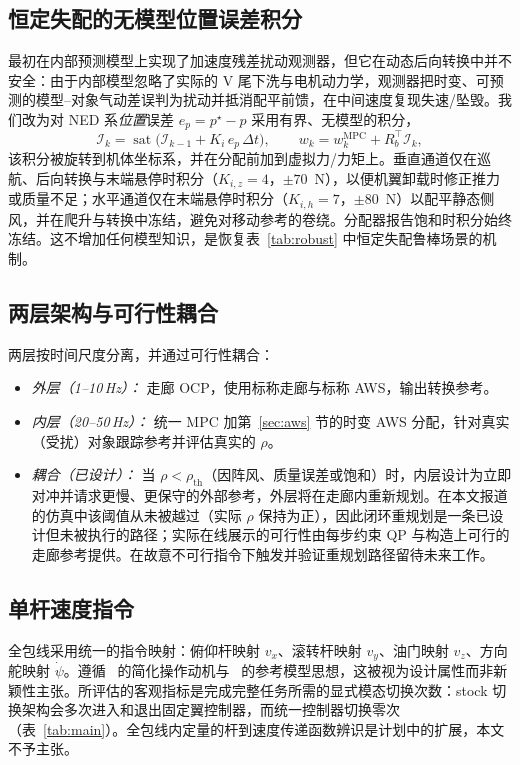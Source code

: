 \documentclass[UTF8,a4paper,11pt]{ctexart}
\begin{document}
\subsection{恒定失配的无模型位置误差积分}\label{sec:integral}
最初在内部预测模型上实现了加速度残差扰动观测器，但它在动态后向转换中并不安全：由于内部模型忽略了实际的 V 尾下洗与电机动力学，观测器把时变、可预测的模型--对象气动差误判为扰动并抵消配平前馈，在中间速度复现失速/坠毁。我们改为对 NED 系\emph{位置}误差 $e_p=p^\star-p$ 采用有界、无模型的积分，
\begin{equation}
\mathcal I_k = \operatorname{sat}\!\bigl(\mathcal I_{k-1}+K_i\,e_p\,\Delta t\bigr),
\qquad
w_k = w_k^{\mathrm{MPC}}+R_b^\top\mathcal I_k ,
\label{eq:integral}
\end{equation}
该积分被旋转到机体坐标系，并在分配前加到虚拟力/力矩上。垂直通道仅在巡航、后向转换与末端悬停时积分（$K_{i,z}=4$，$\pm70$~N），以便机翼卸载时修正推力或质量不足；水平通道仅在末端悬停时积分（$K_{i,h}=7$，$\pm80$~N）以配平静态侧风，并在爬升与转换中冻结，避免对移动参考的卷绕。分配器报告饱和时积分始终冻结。这不增加任何模型知识，是恢复表~\ref{tab:robust} 中恒定失配鲁棒场景的机制。

\subsection{两层架构与可行性耦合}\label{sec:twolayer}
两层按时间尺度分离，并通过可行性耦合：
\begin{itemize}[leftmargin=1.6em,itemsep=2pt]
  \item \emph{外层（1--10\,Hz）：} 走廊 OCP，使用标称走廊与标称 AWS，输出转换参考。
  \item \emph{内层（20--50\,Hz）：} 统一 MPC 加第~\ref{sec:aws} 节的时变 AWS 分配，针对真实（受扰）对象跟踪参考并评估真实的 $\rho$。
  \item \emph{耦合（已设计）：} 当 $\rho<\rho_{\mathrm{th}}$（因阵风、质量误差或饱和）时，内层设计为立即对冲并请求更慢、更保守的外部参考，外层将在走廊内重新规划。在本文报道的仿真中该阈值从未被越过（实际 $\rho$ 保持为正），因此闭环重规划是一条已设计但未被执行的路径；实际在线展示的可行性由每步约束 QP 与构造上可行的走廊参考提供。在故意不可行指令下触发并验证重规划路径留待未来工作。
\end{itemize}

\subsection{单杆速度指令}\label{sec:stick}
全包线采用统一的指令映射：俯仰杆映射 $v_x$、滚转杆映射 $v_y$、油门映射 $v_z$、方向舵映射 $\dot\psi$。遵循~\cite{milz2026taming} 的简化操作动机与~\cite{bhardwaj2018integrated} 的参考模型思想，这被视为设计属性而非新颖性主张。所评估的客观指标是完成完整任务所需的显式模态切换次数：stock 切换架构会多次进入和退出固定翼控制器，而统一控制器切换零次（表~\ref{tab:main}）。全包线内定量的杆到速度传递函数辨识是计划中的扩展，本文不予主张。
\end{document}
